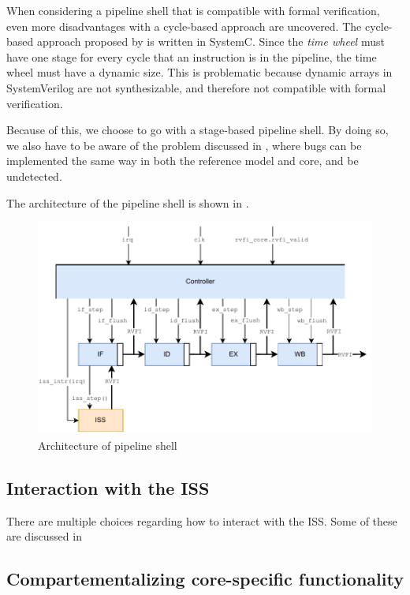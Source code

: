 When considering a pipeline shell that is compatible with formal verification, even more disadvantages with a cycle-based approach are uncovered. The cycle-based approach proposed by \textcite{chiangEfficientTwolayeredCycleaccurate2009} is written in SystemC. Since the \textit{time wheel} must have one stage for every cycle that an instruction is in the pipeline, the time wheel must have a dynamic size. This is problematic because dynamic arrays in SystemVerilog are not synthesizable\cite{mehtaIntroductionSystemVerilog2021}, and therefore not compatible with formal verification\cite{seligmanFormalVerificationEssential2015}.

Because of this, we choose to go with a stage-based pipeline shell. By doing so, we also have to be aware of the problem discussed in , where bugs can be implemented the same way in both the reference model and core, and be undetected.

The architecture of the pipeline shell is shown in . 

\begin{figure}
    \centering
    \includegraphics[width=0.75\linewidth]{figures/Pipeline_shell.pdf}
    \caption{Architecture of pipeline shell}
    \label{fig:pipeline_shell}
\end{figure}

\subsection{Interaction with the ISS}

There are multiple choices regarding how to interact with the ISS. Some of these are discussed in 

\subsection{Compartementalizing core-specific functionality}

